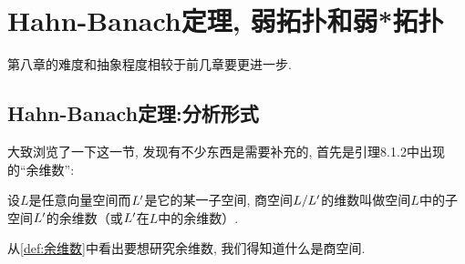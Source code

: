 \chapter{Hahn-Banach定理, 弱拓扑和弱*拓扑}
    第八章的难度和抽象程度相较于前几章要更进一步.
    \section{Hahn-Banach定理:分析形式}
    大致浏览了一下这一节, 发现有不少东西是需要补充的, 首先是引理8.1.2中出现的“余维数”:

    \begin{definition}[余维数]\label{def:余维数}
        设$L$是任意向量空间而$L^{\prime}$是它的某一子空间, 商空间$L/L^{\prime}$的维数叫做空间$L$中的子空间$L^{\prime}$的余维数（或$L^{\prime}$在$L$中的余维数）.
    \end{definition}

    从\autoref{def:余维数}中看出要想研究余维数, 我们得知道什么是商空间.

